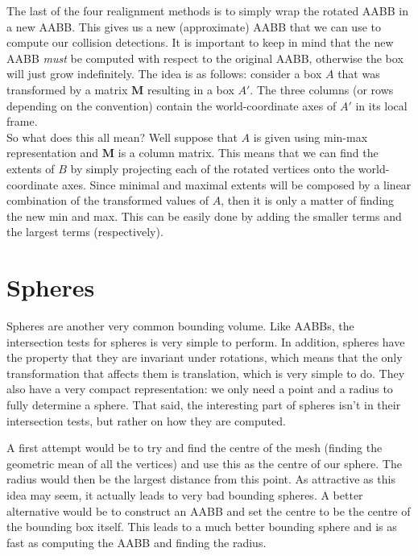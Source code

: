     The last of the four realignment methods is to simply wrap the rotated
    AABB in a new AABB. This gives us a new (approximate) AABB that we can
    use to compute our collision detections. It is important to keep in mind
    that the new AABB \emph{must} be computed with respect to the original
    AABB, otherwise the box will just grow indefinitely.
    The idea is as follows: consider a box $A$ that was transformed by a
    matrix $\mathbf{M}$ resulting in a box $A'$. The three columns (or rows
    depending on the convention) contain the world-coordinate axes of $A'$
    in its local frame. \\
    So what does this all mean? Well suppose that $A$ is given using min-max
    representation and $\mathbf{M}$ is a column matrix. This means that we
    can find the extents of $B$ by simply projecting each of the rotated
    vertices onto the world-coordinate axes. Since minimal and maximal
    extents will be composed by a linear combination of the transformed
    values of $A$, then it is only a matter of finding the new min and max.
    This can be easily done by adding the smaller terms and the largest
    terms (respectively).

  \section{Spheres}
    Spheres are another very common bounding volume. Like AABBs, the
    intersection tests for spheres is very simple to perform. In addition,
    spheres have the property that they are invariant under rotations, which
    means that the only transformation that affects them is translation,
    which is very simple to do. They also have a very compact
    representation: we only need a point and a radius to fully determine a
    sphere. That said, the interesting part of spheres isn't in their
    intersection tests, but rather on how they are computed.

    A first attempt would be to try and find the centre of the mesh (finding
    the geometric mean of all the vertices) and use this as the centre of
    our sphere. The radius would then be the largest distance from this
    point. As attractive as this idea may seem, it actually leads to very
    bad bounding spheres. A better alternative would be to construct an AABB
    and set the centre to be the centre of the bounding box itself. This
    leads to a much better bounding sphere and is as fast as computing the
    AABB and finding the radius.

